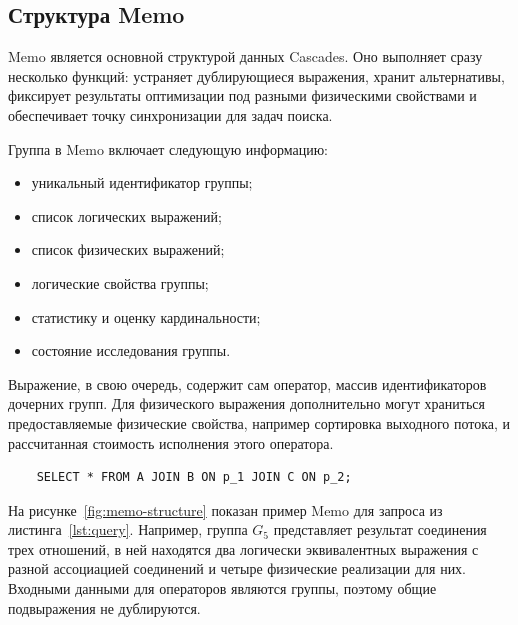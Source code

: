 \documentclass[fontsize=14pt, russian]{scrartcl}
\begin{document}
\subsection{Структура Memo}

Memo является основной структурой данных Cascades. Оно выполняет сразу
несколько функций: устраняет дублирующиеся выражения, хранит альтернативы,
фиксирует результаты оптимизации под разными физическими свойствами и обеспечивает
точку синхронизации для задач поиска.

Группа в Memo включает следующую информацию:

\begin{itemize}
  \item уникальный идентификатор группы;
  \item список логических выражений;
  \item список физических выражений;
  \item логические свойства группы;
  \item статистику и оценку кардинальности;
  \item состояние исследования группы.
\end{itemize}

Выражение, в свою очередь, содержит сам оператор, массив идентификаторов
дочерних групп. Для физического выражения дополнительно могут храниться
предоставляемые физические свойства, например сортировка выходного потока, и
рассчитанная стоимость исполнения этого оператора.

\begin{listing}
  \caption{Пример запроса.}
  \label{lst:query}
  \begin{verbatim}
    SELECT * FROM A JOIN B ON p_1 JOIN C ON p_2;
  \end{verbatim}
\end{listing}

На рисунке~\ref{fig:memo-structure} показан пример Memo для запроса из
листинга~\ref{lst:query}. Например, группа \(G_5\) представляет результат
соединения трех отношений, в ней находятся два логически эквивалентных выражения
с разной ассоциацией соединений и четыре физические реализации для них. Входными
данными для операторов являются группы, поэтому общие подвыражения не
дублируются.
\end{document}
